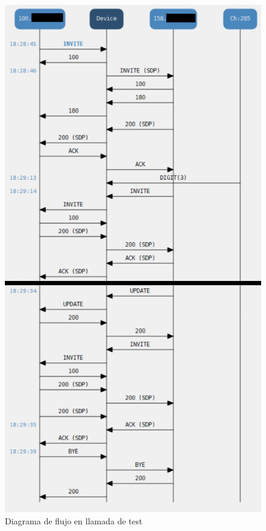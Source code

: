 \documentclass[a4paper, 12pt]{book}
\begin{document}
\begin{figure}
  \centering
  \includegraphics[scale = 1.1]{img/fig_sipflow_diagram}
  \caption{Diagrama de flujo en llamada de test}
  \label{figura:fig_sipflow_diagram}
\end{figure}
\end{document}
